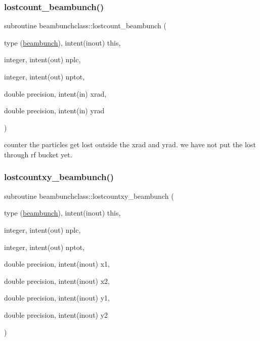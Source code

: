 \subsubsection{\texorpdfstring{lostcount\_beambunch()}{lostcount\_beambunch()}}
{\footnotesize\ttfamily subroutine beambunchclass\+::lostcount\+\_\+beambunch (\begin{DoxyParamCaption}\item[{type (\mbox{\hyperlink{namespacebeambunchclass_structbeambunchclass_1_1beambunch}{beambunch}}), intent(inout)}]{this,  }\item[{integer, intent(out)}]{nplc,  }\item[{integer, intent(out)}]{nptot,  }\item[{double precision, intent(in)}]{xrad,  }\item[{double precision, intent(in)}]{yrad }\end{DoxyParamCaption})}



counter the particles get lost outside the xrad and yrad. we have not put the lost through rf bucket yet. 

\mbox{\label{namespacebeambunchclass_a54a4d80405bb8fbde341ea9e46a224e4}} 
\subsubsection{\texorpdfstring{lostcountxy\_beambunch()}{lostcountxy\_beambunch()}}
{\footnotesize\ttfamily subroutine beambunchclass\+::lostcountxy\+\_\+beambunch (\begin{DoxyParamCaption}\item[{type (\mbox{\hyperlink{namespacebeambunchclass_structbeambunchclass_1_1beambunch}{beambunch}}), intent(inout)}]{this,  }\item[{integer, intent(out)}]{nplc,  }\item[{integer, intent(out)}]{nptot,  }\item[{double precision, intent(inout)}]{x1,  }\item[{double precision, intent(inout)}]{x2,  }\item[{double precision, intent(inout)}]{y1,  }\item[{double precision, intent(inout)}]{y2 }\end{DoxyParamCaption})}



